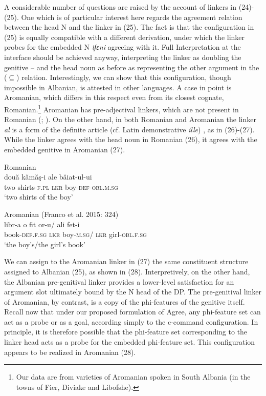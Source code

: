 \documentclass[output=paper]{langsci/langscibook}
\begin{document}
A considerable number of questions are raised by the account of linkers in (24)-(25). One which is of particular interest here regards the agreement relation between the head N and the linker in (25). The fact is that the configuration in (25) is equally compatible with a different derivation, under which the linker probes for the embedded N \textit{tʃɛni} agreeing with it. Full Interpretation at the interface should be achieved anyway, interpreting the linker as doubling the genitive – and the head noun as before as representing the other argument in the ($\subseteq$) relation. Interestingly, we can show that this configuration, though impossible in Albanian, is attested in other languages. A case in point is Aromanian, which differs in this respect even from its closest cognate, Romanian.\footnote{Our data are from varieties of Aromanian spoken in South Albania (in the towns of Fier, Diviake and Libofshe).} Aromanian has pre-adjectival linkers, which are not present in Romanian (\citealt{Campos2008}; \citealt{Cornilescu2013}). On the other hand, in both Romanian and Aromanian the linker \textit{al} is a form of the definite article (cf. Latin demonstrative \textit{ille}) \citep{Giurgea2012}, as in (26)-(27). While the linker agrees with the head noun in Romanian (26), it agrees with the embedded genitive in Aromanian (27).

\ea%
         Romanian\label{ex:manzini:26}\\
    \gll două   kămăş-i   ale   băiat-ul-ui     \\
         two   shirts-\textsc{f.pl}  \textsc{lkr}  boy-\textsc{def-obl.m.sg}   \\
    \glt ‘two shirts of the boy’ 
    \z


\ea%
         Aromanian (Franco et al. 2015: 324) \label{ex:manzini:27}\\
    \gll libr-a       o   {fit or-u}/  ali   fet-i     \\
         book-\textsc{def.f.sg}   \textsc{lkr}  boy\textsc{{}-m.sg}/   \textsc{lkr}  girl-\textsc{obl.f.sg}   \\
    \glt ‘the boy’s/the girl’s book’
    \z


We can assign to the Aromanian linker in (27) the same constituent structure assigned to Albanian (25), as shown in (28). Interpretively, on the other hand, the Albanian pre-genitival linker provides a lower-level satisfaction for an argument slot ultimately bound by the N head of the DP. The pre-genitival linker of Aromanian, by contrast, is a copy of the phi-features of the genitive itself. Recall now that under our proposed formulation of Agree, any phi-feature set can act as a probe or as a goal, according simply to the c-command configuration. In principle, it is therefore possible that the phi-feature set corresponding to the linker head acts as a probe for the embedded phi-feature set. This configuration appears to be realized in Aromanian (28).
\end{document}
